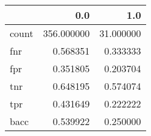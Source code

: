 \begin{tabular}{lrr}
\toprule
{} &         0.0 &        1.0 \\
\midrule
count &  356.000000 &  31.000000 \\
fnr   &    0.568351 &   0.333333 \\
fpr   &    0.351805 &   0.203704 \\
tnr   &    0.648195 &   0.574074 \\
tpr   &    0.431649 &   0.222222 \\
bacc  &    0.539922 &   0.250000 \\
\bottomrule
\end{tabular}
